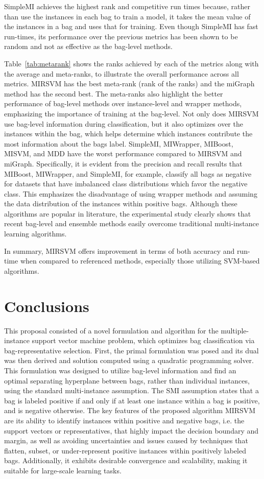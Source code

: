 \documentclass[reqno]{vcuthesis}
\numberwithin{equation}{chapter}
\begin{document}
SimpleMI achieves the highest rank and competitive run times because, rather than use the instances in each bag to train a model, it takes the mean value of the instances in a bag and uses that for training. Even though SimpleMI has fast run-times, its performance over the previous metrics has been shown to be random and not as effective as the bag-level methods.

Table~\ref{tab:metarank} shows the ranks achieved by each of the metrics along with the average and meta-ranks, to illustrate the overall performance across all metrics. MIRSVM has the best meta-rank (rank of the ranks) and the miGraph method has the second best. The meta-ranks also highlight the better performance of bag-level methods over instance-level and wrapper methods, emphasizing the importance of training at the bag-level. Not only does MIRSVM use bag-level information during classification, but it also optimizes over the instances within the bag, which helps determine which instances contribute the most information about the bags label. SimpleMI, MIWrapper, MIBoost, MISVM, and MDD have the worst performance compared to MIRSVM and miGraph. Specifically, it is evident from the precision and recall results that MIBoost, MIWrapper, and SimpleMI, for example, classify all bags as negative for datasets that have imbalanced class distributions which favor the negative class. This emphasizes the disadvantage of using wrapper methods and assuming the data distribution of the instances within positive bags. Although these algorithms are popular in literature, the experimental study clearly shows that recent bag-level and ensemble methods easily overcome traditional multi-instance learning algorithms. 

In summary, MIRSVM offers improvement in terms of both accuracy and run-time when compared to referenced methods, especially those utilizing SVM-based algorithms.

\section{Conclusions}
This proposal consisted of a novel formulation and algorithm for the multiple-instance support vector machine problem, which optimizes bag classification via bag-representative selection. First, the primal formulation was posed and its dual was then derived and solution computed using a quadratic programming solver. This formulation was designed to utilize bag-level information and find an optimal separating hyperplane between bags, rather than individual instances, using the standard multi-instance assumption. The SMI assumption states that a bag is labeled positive if and only if at least one instance within a bag is positive, and is negative otherwise. The key features of the proposed algorithm MIRSVM are its ability to identify instances within positive and negative bags, i.e. the support vectors or representatives, that highly impact the decision boundary and margin, as well as avoiding uncertainties and issues caused by techniques that flatten, subset, or under-represent positive instances within positively labeled bags. Additionally, it exhibits desirable convergence and scalability, making it suitable for large-scale learning tasks.
\end{document}

